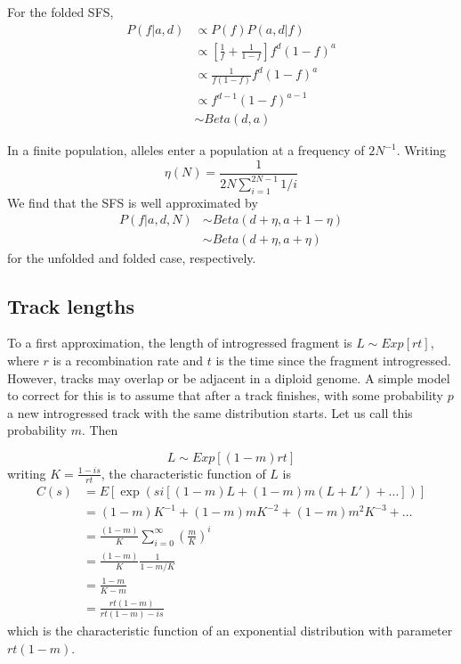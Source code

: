 \documentclass[10pt,a4paper]{article}
\begin{document}
For the folded SFS,
\begin{align}
P(f | a, d) &\propto P(f) P(a, d|f) \nonumber\\
&\propto \left[ \frac{1}{f} + \frac{1}{1-f}\right] f^d (1-f)^a\nonumber\\
&\propto \frac{1}{f(1-f)} f^d (1-f)^a\nonumber\\
&\propto f^{d-1} (1-f)^{a-1} \nonumber\\
&\sim Beta(d, a)
\end{align}

In a finite population, alleles enter a population at a frequency of $2N^{-1}$. Writing
$$\eta(N) = \frac{1}{2N \sum_{i=1}^{2N-1}1/i}$$
We find that the SFS is well approximated by 
\begin{align}
P(f | a, d, N) &\sim Beta(d + \eta, a+1 - \eta)\\
&\sim Beta(d + \eta, a + \eta)
\end{align}
for the unfolded and folded case, respectively.
		
\subsection{Track lengths}
To a first approximation, the length of introgressed fragment is 
$L \sim Exp[r t ]$, where $r$ is a recombination rate and $t$ is the time since the fragment introgressed. However, tracks may overlap or be adjacent in a diploid genome. A simple model to correct for this is to assume that after a track finishes, with some probability $p$ a new introgressed track with the same distribution starts. Let us call this probability $m$. Then

\begin{equation}
L \sim Exp[(1-m)rt]
\end{equation}
writing $K = \frac{1-is}{rt}$, the characteristic function of $L$ is
\begin{align}
C(s) &= E[\exp(si [(1-m)L + (1-m)m (L+L')+ \dots  ] )]\nonumber\\
&=(1-m) K^{-1} + (1-m)m K^{-2} +(1-m)m^2 K^{-3} + \dots\nonumber\\
&=\frac{(1-m)}{K} \sum_{i=0}^\infty \left(\frac{m}{K}\right)^{i} \nonumber\\
&= \frac{(1-m)}{K} \frac{1}{1 - m/K}\nonumber\\
&= \frac{1-m}{K-m}\nonumber\\
&= \frac{rt(1-m)}{rt (1-m) - is}\nonumber
\end{align}
which is the characteristic function of an exponential distribution with parameter $rt(1-m)$.
\end{document}
